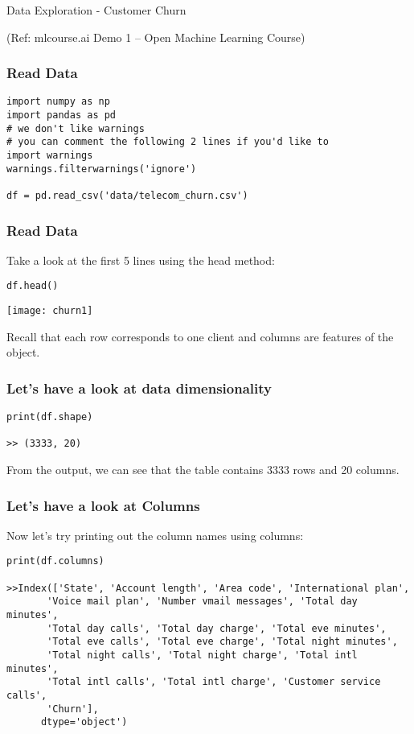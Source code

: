 \begin{frame}[fragile]\frametitle{}
\begin{center}
{\Large Data Exploration - Customer Churn}
\end{center}

{\tiny (Ref: mlcourse.ai Demo 1 – Open Machine Learning Course) }
\end{frame}

\begin{frame}[fragile]\frametitle{Read Data}	
\begin{lstlisting}
import numpy as np
import pandas as pd
# we don't like warnings
# you can comment the following 2 lines if you'd like to
import warnings
warnings.filterwarnings('ignore')

df = pd.read_csv('data/telecom_churn.csv')
\end{lstlisting}
\end{frame}


\begin{frame}[fragile]\frametitle{Read Data}	
Take a look at the first 5 lines using the head method:
\begin{lstlisting}
df.head()
\end{lstlisting}
\begin{center}
\texttt{[image: churn1]}
\end{center}
Recall that each row corresponds to one client and columns are features of the object.
\end{frame}

\begin{frame}[fragile]\frametitle{Let's have a look at data dimensionality}	
\begin{lstlisting}
print(df.shape)

>> (3333, 20)
\end{lstlisting}
From the output, we can see that the table contains 3333 rows and 20 columns. 
\end{frame}

\begin{frame}[fragile]\frametitle{Let's have a look at Columns}	
Now let's try printing out the column names using columns:
\begin{lstlisting}
print(df.columns)

>>Index(['State', 'Account length', 'Area code', 'International plan',
       'Voice mail plan', 'Number vmail messages', 'Total day minutes',
       'Total day calls', 'Total day charge', 'Total eve minutes',
       'Total eve calls', 'Total eve charge', 'Total night minutes',
       'Total night calls', 'Total night charge', 'Total intl minutes',
       'Total intl calls', 'Total intl charge', 'Customer service calls',
       'Churn'],
      dtype='object')
\end{lstlisting}
\end{frame}

